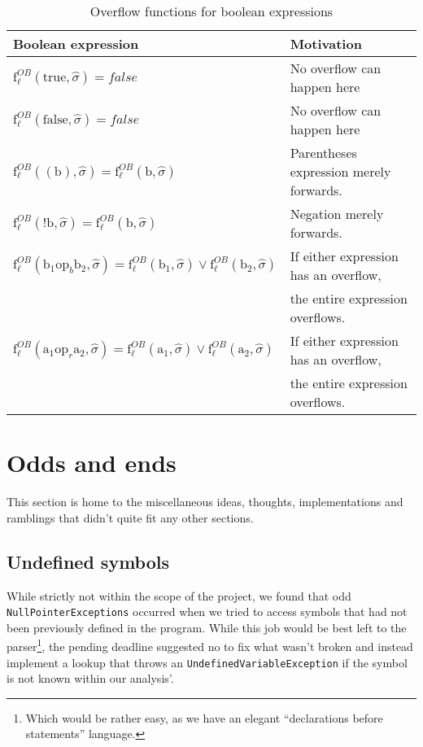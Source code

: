 \begin{table}[h]
\begin{tabular}{| l | l |}
  \hline
  Boolean expression & Motivation\\
  \hline
  \hline
  $\text{f}_\ell^{OB} (\text{true},\widehat{\sigma}) = false $ & No overflow can happen here\\ 
  \hline
  $\text{f}_\ell^{OB} (\text{false},\widehat{\sigma}) = false $ & No overflow can happen here\\ 
  \hline
  $\text{f}_\ell^{OB} ((\text{b}),\widehat{\sigma}) = \text{f}_\ell^{OB} (\text{b}, \widehat{\sigma}) $ & Parentheses expression merely forwards.\\ 
  \hline
    $\text{f}_\ell^{OB} (\text{!b},\widehat{\sigma}) = \text{f}_\ell^{OB} (\text{b}, \widehat{\sigma}) $ & Negation merely forwards.\\ 
  \hline
   $\text{f}_\ell^{OB} (\text{b}_1 \text{op}_b \text{b}_2, \widehat{\sigma}) = \text{f}_\ell^{OB} (\text{b}_1, \widehat{\sigma}) \vee \text{f}_\ell^{OB} (\text{b}_2, \widehat{\sigma})$ & If either expression has an overflow,\\
                                & the entire expression overflows.\\   
  \hline
     $\text{f}_\ell^{OB} (\text{a}_1 \text{op}_r \text{a}_2, \widehat{\sigma}) = \text{f}_\ell^{OB} (\text{a}_1, \widehat{\sigma}) \vee \text{f}_\ell^{OB} (\text{a}_2, \widehat{\sigma})$ & If either expression has an overflow,\\
                                & the entire expression overflows.\\   
  \hline
\end{tabular}
\centering
\caption{Overflow functions for boolean expressions}
\label{table:overflow_functions_boolean_expressions}
\end{table}





\section{Odds and ends}
This section is home to the miscellaneous ideas, thoughts, implementations and ramblings that didn't quite fit any other sections.

\subsection{Undefined symbols}
While strictly not within the scope of the project, we found that odd \texttt{NullPointerExceptions} occurred when we tried to access symbols that had not been previously defined in the program. While this job would be best left to the parser\footnote{Which would be rather easy, as we have an elegant ``declarations before statements'' language.}, the pending deadline suggested no to fix what wasn't broken and instead implement a lookup that throws an \texttt{UndefinedVariableException} if the symbol is not known within our analysis'.



